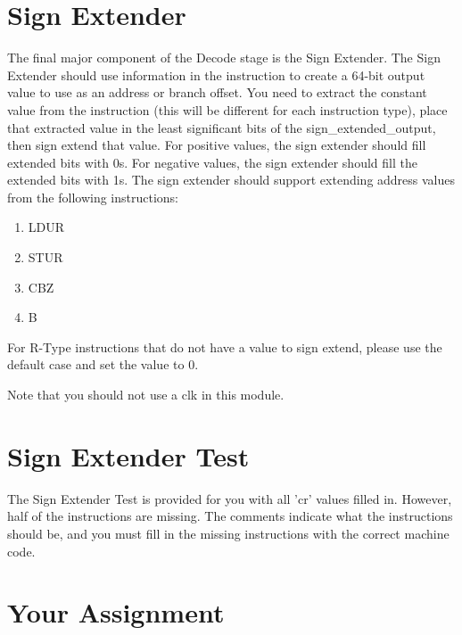 \section{Sign Extender}
The final major component of the Decode stage is the Sign Extender.  The Sign Extender should use information in the instruction to create a 64-bit output value to use as an address or branch offset.  You need to extract the constant value from the instruction (this will be different for each instruction type), place that extracted value in the least significant bits of the sign\_extended\_output, then sign extend that value.  For positive values, the sign extender should fill extended bits with 0s.  For negative values, the sign extender should fill the extended bits with 1s.  The sign extender should support extending address values from the following instructions:
\begin{enumerate}
	\item LDUR
	\item STUR
	\item CBZ
	\item B
\end{enumerate}
For R-Type instructions that do not have a value to sign extend, please use the default case and set the value to 0.

Note that you should not use a clk in this module.

\section{Sign Extender Test}
The Sign Extender Test is provided for you with all 'cr' values filled in.  However, half of the instructions are missing.  The comments indicate what the instructions should be, and you must fill in the missing instructions with the correct machine code.

\clearpage
\section{Your Assignment}

